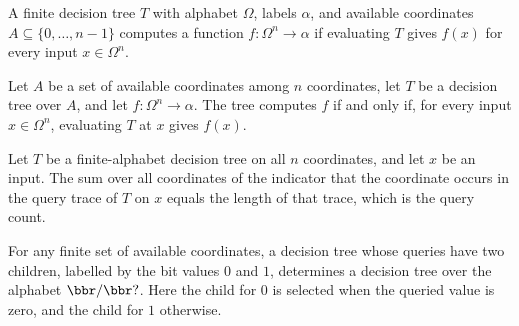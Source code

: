 \begin{definition}
\label{FABL.FiniteDecisionTree.Computes}
\leanok
{}
A finite decision tree $T$ with alphabet $\Omega$, labels $\alpha$, and available
coordinates $A\subseteq\{0,\ldots,n-1\}$ computes a function $f:\Omega^n\to\alpha$ if
evaluating $T$ gives $f(x)$ for every input $x\in\Omega^n$.
\end{definition}

\begin{theorem}
\label{FABL.FiniteDecisionTree.computes_iff}
\leanok
{}
Let $A$ be a set of available coordinates among $n$ coordinates, let $T$ be a decision
tree over $A$, and let $f:\Omega^n\to\alpha$. The tree computes $f$ if and only if, for
every input $x\in\Omega^n$, evaluating $T$ at $x$ gives $f(x)$.
\end{theorem}

\begin{theorem}
\label{FABL.FiniteDecisionTree.sum_queryIndicator_eq_queryCount}
\leanok
{}
Let $T$ be a finite-alphabet decision tree on all $n$ coordinates, and let $x$ be an
input. The sum over all coordinates of the indicator that the coordinate occurs in the
query trace of $T$ on $x$ equals the length of that trace, which is the query count.
\end{theorem}

\begin{definition}
\leanok
{}
For any finite set of available coordinates, a decision tree whose queries have two
children, labelled by the bit values $0$ and $1$, determines a decision tree over the
alphabet $\bbr/\bbr?$. Here the child for $0$ is selected when the queried value is zero,
and the child for $1$ otherwise.
\end{definition}

